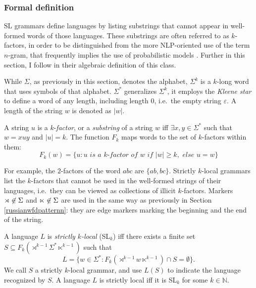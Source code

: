 \subsubsection{Formal definition}
\label{substringformal}

SL grammars define languages by listing substrings that cannot appear in well-formed words of those languages.
These substrings are often referred to as $k$-factors, in order to be distinguished from the more NLP-oriented use of the term $n$-gram, that frequently implies the use of probabilistic models \citep{RogersPullum2011,RogersEtAl13}.
Further in this section, I follow \cite{DeSantoGraf19FG} in their algebraic definition of this class.

While $\Sigma$, as previously in this section, denotes the alphabet, $\Sigma^{k}$ is a $k$-long word that uses symbols of that alphabet.
$\Sigma^{*}$ generalizes $\Sigma^{k}$, it employs the \emph{Kleene star} \citep{Kleene1956} to define a word of any length, including length $0$, i.e.\ the empty string $\varepsilon$.
A length of the string $w$ is denoted as $|w|$.

\begin{definition}
A string $u$ is a $k$-\emph{factor}, or a \emph{substring} of a string $w$ iff $\exists x, y \in \Sigma^*$ such that $w=xuy$ and $|u| = k$. 
The function $F_k$ maps words to the set of $k$-factors within them:
$$
F_k(w) = \{ u : u \textit{ is a $k$-factor of } w \textit{ if } |w| \geq k, 
\textit{ else } u = w\}
$$
\end{definition}

For example, the $2$-factors of the word $abc$ are $\{ab, bc\}$.
Strictly $k$-local grammars list the $k$-factors that cannot be used in the well-formed strings of their languages, i.e.\ they can be viewed as collections of illicit $k$-factors.
Markers $\rtimes\not\in\Sigma$ and $\ltimes\not\in\Sigma$ are used in the same way as previously in Section \ref{russianwfdpatternn}: they are edge markers marking the beginning and the end of the string.


\begin{definition}
A language $L$ is \emph{strictly $k$-local} (SL$_k$) iff there exists a finite set $S \subseteq F_k (\rtimes^{k-1} \Sigma^* \ltimes^{k-1})$ such that
\[
L = \{ w \in \Sigma^*: F_k(\rtimes^{k-1} w \ltimes^{k-1}) \cap S = \emptyset \}.
\]
We call $S$ a strictly $k$-local grammar, and use $L(S)$  to indicate the language recognized by $S$.
A language $L$ is strictly local iff it is SL$_k$ for some $k \in \mathbb{N}$.
\end{definition}

